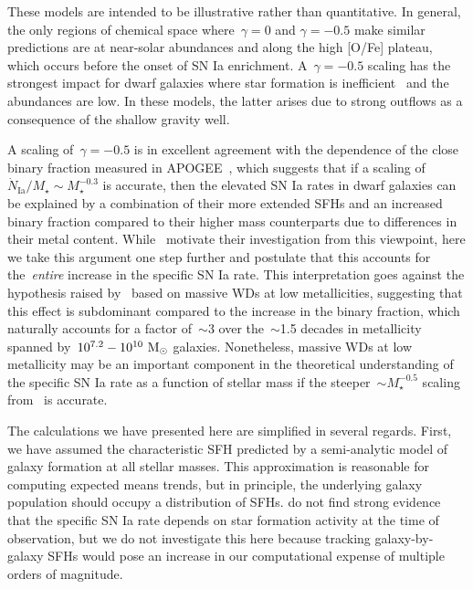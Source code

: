 \documentclass[ms.tex]{subfiles}
\begin{document}
\par
These models are intended to be illustrative rather than quantitative.
In general, the only regions of chemical space where~$\gamma = 0$ and
$\gamma = -0.5$ make similar predictions are at near-solar abundances and along
the high [O/Fe] plateau, which occurs before the onset of SN Ia enrichment.
A~$\gamma = -0.5$ scaling has the strongest impact for dwarf galaxies where
star formation is inefficient~\citep[e.g.][]{Hudson2015} and the abundances are
low.
In these models, the latter arises due to strong outflows as a consequence of
the shallow gravity well.
\par
A scaling of~$\gamma = -0.5$ is in excellent agreement with the dependence of
the close binary fraction measured in APOGEE~\citep{Moe2019}, which suggests
that if a scaling of~$\dot{N}_\text{Ia} / M_\star \sim M_\star^{-0.3}$ is
accurate, then the elevated SN Ia rates in dwarf galaxies can be explained by a
combination of their more extended SFHs and an increased binary fraction
compared to their higher mass counterparts due to differences in their metal
content.
While~\citet{Gandhi2022} motivate their investigation from this viewpoint, here
we take this argument one step further and postulate that this accounts for
the~\textit{entire} increase in the specific SN Ia rate.
This interpretation goes against the hypothesis raised by~\citet{Kistler2013}
based on massive WDs at low metallicities, suggesting that this effect is
subdominant compared to the increase in the binary fraction, which naturally
accounts for a factor of~$\sim$3 over the~$\sim$1.5 decades in metallicity
spanned by~$10^{7.2} - 10^{10}~\text{M}_\odot$ galaxies.
Nonetheless, massive WDs at low metallicity may be an important component in
the theoretical understanding of the specific SN Ia rate as a function of
stellar mass if the steeper~$\sim M_\star^{-0.5}$ scaling from~\citet{Brown2019}
is accurate.
\par
The calculations we have presented here are simplified in several regards.
First, we have assumed the characteristic SFH predicted by a semi-analytic
model of galaxy formation at all stellar masses.
This approximation is reasonable for computing expected means trends, but in
principle, the underlying galaxy population should occupy a distribution of
SFHs.
\citet{Brown2019} do not find strong evidence that the specific SN Ia rate
depends on star formation activity at the time of observation, but we do not
investigate this here because tracking galaxy-by-galaxy SFHs would pose an
increase in our computational expense of multiple orders of magnitude.
\end{document}
